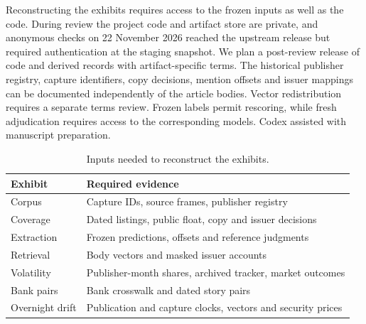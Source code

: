 Reconstructing the exhibits requires access to the frozen inputs as
well as the code. During review the project code and artifact store are
private, and anonymous checks on 22 November 2026 reached the upstream
release but required authentication at the staging snapshot.
We plan a post-review release
of code and derived records with artifact-specific terms. The historical
publisher registry, capture identifiers, copy decisions, mention offsets
and issuer mappings can be documented independently of the article bodies.
Vector redistribution requires a separate terms review.
Frozen labels permit rescoring, while fresh adjudication requires access
to the corresponding models. Codex assisted with manuscript preparation.

\begin{table}[!ht]\centering\small
  \caption{Inputs needed to reconstruct the exhibits.}
  \label{tab:app-access}
  \begin{tabular}{lp{}}\toprule
    Exhibit & Required evidence \\ \midrule
    Corpus & Capture IDs, source frames, publisher registry \\
    Coverage & Dated listings, public float, copy and issuer decisions \\
    Extraction & Frozen predictions, offsets and reference judgments \\
    Retrieval & Body vectors and masked issuer accounts \\
    Volatility & Publisher-month shares, archived tracker, market outcomes \\
    Bank pairs & Bank crosswalk and dated story pairs \\
    Overnight drift & Publication and capture clocks, vectors and
    security prices \\
    \bottomrule
  \end{tabular}
\end{table}
